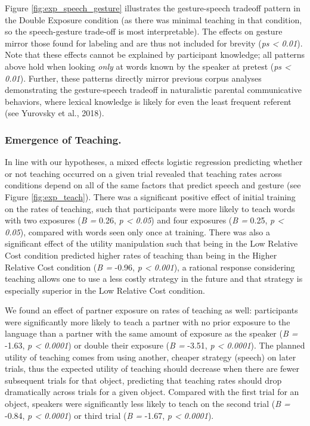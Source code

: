 \documentclass[10pt, letterpaper]{article}
\begin{document}
Figure \ref{fig:exp_speech_gesture} illustrates the gesture-speech
tradeoff pattern in the Double Exposure condition (as there was minimal
teaching in that condition, so the speech-gesture trade-off is most
interpretable). The effects on gesture mirror those found for labeling
and are thus not included for brevity (\emph{ps \textless{} 0.01}). Note
that these effects cannot be explained by participant knowledge; all
patterns above hold when looking \emph{only} at words known by the
speaker at pretest (\emph{ps \textless{} 0.01}). Further, these patterns
directly mirror previous corpus analyses demonstrating the
gesture-speech tradeoff in naturalistic parental communicative
behaviors, where lexical knowledge is likely for even the least frequent
referent (see Yurovsky et al., 2018).\\
\newline

\subsubsection{Emergence of Teaching.}\label{emergence-of-teaching.}

In line with our hypotheses, a mixed effects logistic regression
predicting whether or not teaching occurred on a given trial revealed
that teaching rates across conditions depend on all of the same factors
that predict speech and gesture (see Figure \ref{fig:exp_teach}). There
was a significant positive effect of initial training on the rates of
teaching, such that participants were more likely to teach words with
two exposures (\emph{B =} 0.26, \emph{p \textless{} 0.05}) and four
exposures (\emph{B =} 0.25, \emph{p \textless{} 0.05}), compared with
words seen only once at training. There was also a significant effect of
the utility manipulation such that being in the Low Relative Cost
condition predicted higher rates of teaching than being in the Higher
Relative Cost condition (\emph{B =} -0.96, \emph{p \textless{} 0.001}),
a rational response considering teaching allows one to use a less costly
strategy in the future and that strategy is especially superior in the
Low Relative Cost condition.

We found an effect of partner exposure on rates of teaching as well:
participants were significantly more likely to teach a partner with no
prior exposure to the language than a partner with the same amount of
exposure as the speaker (\emph{B =} -1.63, \emph{p \textless{} 0.0001})
or double their exposure (\emph{B =} -3.51, \emph{p \textless{}
0.0001}). The planned utility of teaching comes from using another,
cheaper strategy (speech) on later trials, thus the expected utility of
teaching should decrease when there are fewer subsequent trials for that
object, predicting that teaching rates should drop dramatically across
trials for a given object. Compared with the first trial for an object,
speakers were significantly less likely to teach on the second trial
(\emph{B =} -0.84, \emph{p \textless{} 0.0001}) or third trial (\emph{B
=} -1.67, \emph{p \textless{} 0.0001}).
\end{document}
